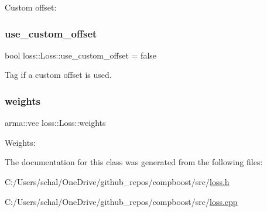 Custom offset\+: 

\mbox{\label{classloss_1_1_loss_a5fabbbb104e6f430498630130ac8a131}} 
\subsubsection{\texorpdfstring{use\+\_\+custom\+\_\+offset}{use\_custom\_offset}}
{\footnotesize\ttfamily bool loss\+::\+Loss\+::use\+\_\+custom\+\_\+offset = false\hspace{0.3cm}{\ttfamily [protected]}}



Tag if a custom offset is used. 

\mbox{\label{classloss_1_1_loss_a4cfecaa4e3a6244ec82651607340e751}} 
\subsubsection{\texorpdfstring{weights}{weights}}
{\footnotesize\ttfamily arma\+::vec loss\+::\+Loss\+::weights\hspace{0.3cm}{\ttfamily [protected]}}



Weights\+: 



The documentation for this class was generated from the following files\+:\begin{DoxyCompactItemize}
\item 
C\+:/\+Users/schal/\+One\+Drive/github\+\_\+repos/compboost/src/\mbox{\hyperlink{loss_8h}{loss.\+h}}\item 
C\+:/\+Users/schal/\+One\+Drive/github\+\_\+repos/compboost/src/\mbox{\hyperlink{loss_8cpp}{loss.\+cpp}}\end{DoxyCompactItemize}
